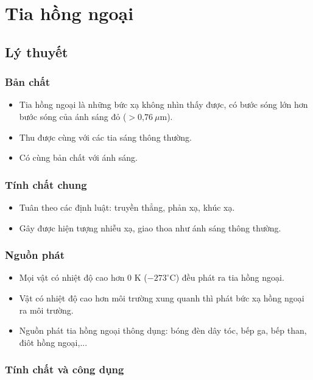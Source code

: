 
\chapter[Tia hồng ngoại]{Tia hồng ngoại}
\section{Lý thuyết}
\subsection {Bản chất}
\begin{itemize}
	\item Tia hồng ngoại là những bức xạ không nhìn thấy được, có bước sóng lớn hơn bước sóng của ánh sáng đỏ ($> \text{0,76}\ \mu \text{m}$). 
	\item Thu được cùng với các tia sáng thông thường.
	\item Có cùng bản chất với ánh sáng.
\end{itemize}

\subsection{Tính chất chung}
\begin{itemize}
	\item Tuân theo các định luật: truyền thẳng, phản xạ, khúc xạ.
	\item Gây được hiện tượng nhiễu xạ, giao thoa như ánh sáng thông thường. 
\end{itemize}

\subsection{Nguồn phát}
\begin{itemize}
	\item Mọi vật có nhiệt độ cao hơn 0 K ($-273^\circ \text{C}$) đều phát ra tia hồng ngoại.
	\item Vật có nhiệt độ cao hơn môi trường xung quanh thì phát bức xạ hồng ngoại ra môi trường.
	\item Nguồn phát tia hồng ngoại thông dụng: bóng đèn dây tóc, bếp ga, bếp than, điôt hồng ngoại,...
\end{itemize}

\subsection{Tính chất và công dụng}

